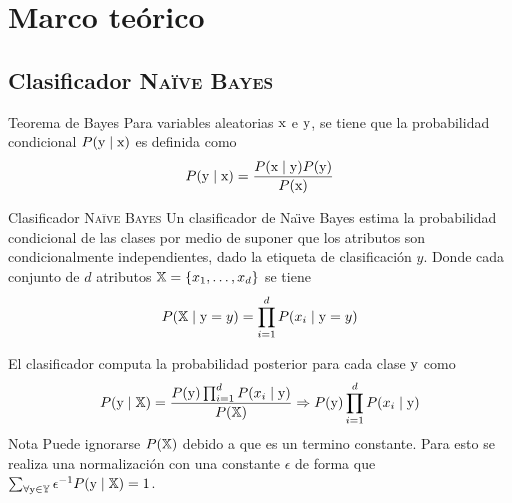 \documentclass[10pt]{beamer}
\begin{document}
\section{Marco teórico}

\subsection{Clasificador \textsc{Na\"ive Bayes}}
\begin{frame}{Teorema de Bayes}
  Para variables aleatorias ${\textnormal{x}}$ e ${\textnormal{y}}$, se tiene que la probabilidad condicional $P({\textnormal{y}} \mid {\textnormal{x}})$ es definida como
  \begin{equation*}
    P({\textnormal{y}} \mid {\textnormal{x}}) = \frac{P({\textnormal{x}} \mid {\textnormal{y}}) P({\textnormal{y}})}{P({\textnormal{x}})}
  \end{equation*}
\end{frame}

\begin{frame}{Clasificador \textsc{Na\"ive Bayes}}
  Un clasificador de Na\"{\i}ve Bayes estima la probabilidad condicional de las clases por medio de suponer que los atributos son condicionalmente independientes, dado la etiqueta de clasificación $y$. Donde cada conjunto de $d$ atributos ${\mathbb{X}}=\{ x_1, \ldots, x_d \}$ se tiene
  \begin{equation*}
    P({\mathbb{X}}\mid{\textnormal{y}}=y) = \prod_{i=1}^{d} P(x_i\mid{\textnormal{y}}=y)
  \end{equation*}

  El clasificador computa la probabilidad posterior para cada clase ${\textnormal{y}}$ como
  \begin{equation*}
    P({\textnormal{y}}\mid {\mathbb{X}}) = \frac{P({\textnormal{y}}) \prod_{i=1}^{d}P(x_i\mid{\textnormal{y}})}{P({\mathbb{X}})} \Rightarrow P({\textnormal{y}}) \prod_{i=1}^{d}P(x_i\mid{\textnormal{y}})
  \end{equation*}
  \alert{Nota} Puede ignorarse $P({\mathbb{X}})$ debido a que es un termino constante. Para esto se realiza una normalización con una constante $\epsilon$ de forma que $\sum_{\forall {\textnormal{y}} \in {\mathbb{Y}}} \epsilon^{-1} P({\textnormal{y}}\mid {\mathbb{X}}) = 1$.
\end{frame}
\end{document}
